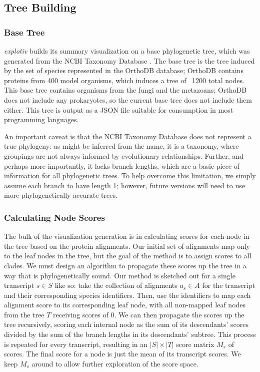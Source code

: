 \documentclass[12pt]{article} %
\begin{document}
\subsection{Tree Building}

\subsubsection{Base Tree}

\textit{explotiv} builds its summary visualization on a base phylogenetic tree, which was generated from the NCBI Taxonomy Database
\cite{sayers_database_2009}. The base tree is the tree induced by the set of species represented in the OrthoDB
database; OrthoDB contains proteins from 400 model organisms, which induces a tree of ~1200 total nodes. 
This base tree contains organisms from the fungi and the metazoans; OrthoDB does not include any prokaryotes,
so the current base tree does not include them either. This tree is output as a JSON file suitable for consumption 
in most programming languages.

An important caveat is that the NCBI Taxonomy Database does not represent a true phylogeny: as might be inferred 
from the name, it is a taxonomy, where groupings are not always informed by evolutionary relationships.
Further, and perhaps more importantly, it lacks branch lengths, which are a basic piece of information for all phylogenetic
trees. To help overcome this limitation, we simply assume each branch to have length 1; however, future versions
will need to use more phylogenetically accurate trees.

\subsubsection{Calculating Node Scores}

The bulk of the visualization generation is in calculating scores for each node in the tree based on the protein alignments.
Our initial set of alignments map only to the leaf nodes in the tree, but the goal of the method is to assign scores
to all clades. We must design an algorithm to propagate these scores up the tree in a way that is phylogenetically sound.
Our method is sketched out for a single transcript $s \in S$ like so: take the collection of alignments $a_s \in A$ for the transcript 
and their corresponding species identifiers. Then, use the identifiers to map each alignment score to its corresponding leaf
node, with all non-mapped leaf nodes from the tree $T$ receiving scores of 0. We can then propagate the scores up the tree recursively, 
scoring each internal node as the sum of its descendants' scores divided by the sum of the branch lengths in its descendants' subtree. This process is repeated for every transcript, resulting in an $|S| \times |T|$ score matrix $M_s$ of scores. The final score for a node
is just the mean of its transcript scores. We keep $M_s$ around to allow further exploration of the score space.
\end{document}
